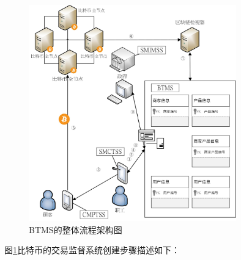 	\begin{figure}[!htbp]
		\centering
		\includegraphics[width = 0.8\textwidth]{fig4.jpg}
		\caption{BTMS的整体流程架构图}\label{fig4}
	\end{figure}

	图\ref{fig4}比特币的交易监督系统创建步骤描述如下：

